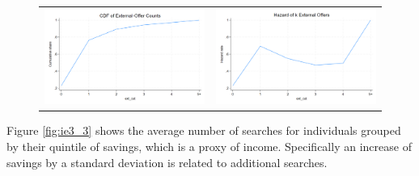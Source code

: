 \documentclass[12pt]{article}
\begin{document}
\begin{figure}[H]
\caption{}
 \label{fig:ie3_2}
\centering{}%
\begin{tabular}{cc}
\includegraphics[scale=0.27]{figures/IE3_CDF_number_extoffers.png} &\includegraphics[scale=0.27]{figures/IE3_hazard_number_extoffers.png}
\end{tabular}
\end{figure}



Figure \ref{fig:ie3_3} shows the average number of searches for individuals grouped by their quintile of savings, which is a proxy of income. Specifically an increase of savings by a standard deviation is related to  additional searches. 
\end{document}
